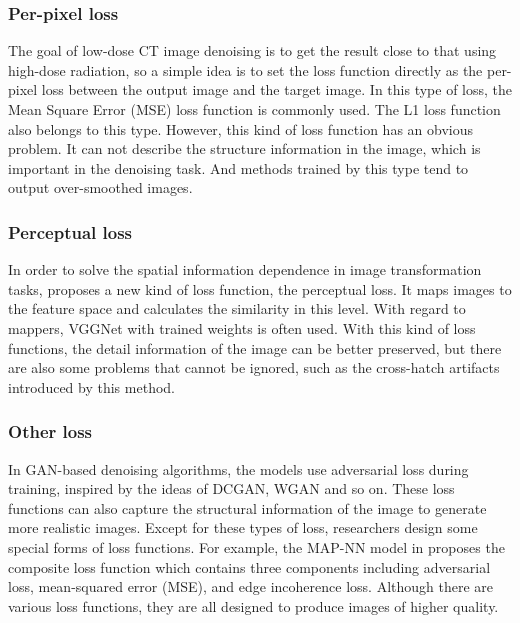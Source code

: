 \documentclass[conference]{IEEEtran}
\begin{document}
        \smallskip
        \setcounter{subsubsection}{0}

        \subsubsection{Per-pixel loss}
            The goal of low-dose CT image denoising is to get the result close to that using high-dose radiation, so a simple idea is to set the loss function directly as the per-pixel loss between the output image and the target image.
            In this type of loss, the Mean Square Error (MSE) loss function is commonly used\cite{kang_deep_2017}\cite{Chen_2017}. 
            The L1 loss function also belongs to this type.
            However, this kind of loss function has an obvious problem. 
            It can not describe the structure information in the image, which is important in the denoising task. 
            And methods trained by this type tend to output over-smoothed images\cite{Chen_2017}.

        \subsubsection{Perceptual loss}
            In order to solve the spatial information dependence in image transformation tasks, \cite{10.1007/978-3-319-46475-6_43} proposes a new kind of loss function, the perceptual loss.
            It maps images to the feature space and calculates the similarity in this level.
            With regard to mappers, VGGNet\cite{simonyan2014deep} with trained weights is often used.
            With this kind of loss functions, the detail information of the image can be better preserved, but there are also some problems that cannot be ignored, such as the cross-hatch artifacts introduced by this method.

        \subsubsection{Other loss}
            In GAN-based denoising algorithms, the models use adversarial loss during training, inspired by the ideas of DCGAN\cite{radford2015unsupervised}, WGAN\cite{arjovsky2017wasserstein} and so on.
            These loss functions can also capture the structural information of the image to generate more realistic images.
            Except for these types of loss, researchers design some special forms of loss functions. 
            For example, the MAP-NN model in \cite{shan_competitive_2019} proposes the composite loss function which contains three components including adversarial loss, mean-squared error (MSE), and edge incoherence loss.
            Although there are various loss functions, they are all designed to produce images of higher quality.
            
\end{document}
